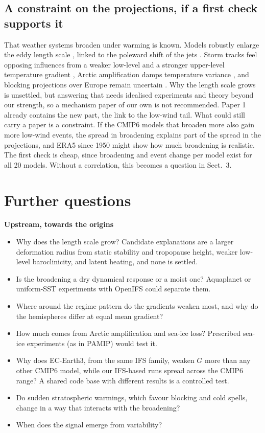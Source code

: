 \documentclass[10pt,a4paper]{article}
\begin{document}
\subsection{A constraint on the projections, if a first check supports it}
That weather systems broaden under warming is known. Models robustly enlarge the eddy length scale
\cite{Kidston2010}, linked to the poleward shift of the jets \cite{Kidston2011}. Storm tracks feel opposing
influences from a weaker low-level and a stronger upper-level temperature gradient \cite{Shaw2016}, Arctic amplification
damps temperature variance \cite{Screen2014}, and blocking projections over Europe remain uncertain \cite{Woollings2018}.
Why the length scale grows is unsettled, but answering that needs idealised experiments and theory beyond our
strength, so a mechanism paper of our own is not recommended. Paper 1 already contains the new part, the link to the
low-wind tail. What could still carry a paper is a constraint. If the CMIP6 models that broaden more also gain more
low-wind events, the spread in broadening explains part of the spread in the projections, and ERA5 since 1950 might
show how much broadening is realistic. The first check is cheap, since broadening and event change per model exist
for all 20 models. Without a correlation, this becomes a question in Sect.~3.

\section{Further questions}

\textbf{Upstream, towards the origins}
\begin{itemize}
\item Why does the length scale grow? Candidate explanations are a larger deformation radius from static stability
      and tropopause height, weaker low-level baroclinicity, and latent heating, and none is settled.
\item Is the broadening a dry dynamical response or a moist one? Aquaplanet or uniform-SST experiments with OpenIFS
      could separate them.
\item Where around the regime pattern do the gradients weaken most, and why do the hemispheres differ at equal mean
      gradient?
\item How much comes from Arctic amplification and sea-ice loss? Prescribed sea-ice experiments (as in PAMIP) would test it.
\item Why does EC-Earth3, from the same IFS family, weaken $G$ more than any other CMIP6 model, while our IFS-based
      runs spread across the CMIP6 range? A shared code base with different results is a controlled test.
\item Do sudden stratospheric warmings, which favour blocking and cold spells, change in a way that interacts with
      the broadening?
\item When does the signal emerge from variability?
\end{itemize}
\end{document}
